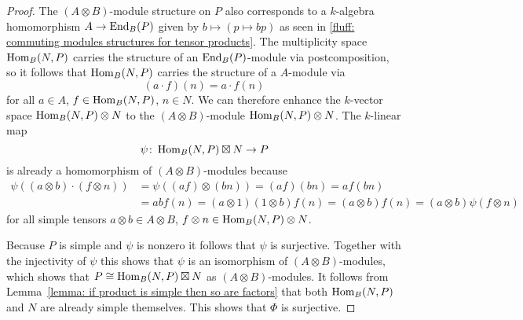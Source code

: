 \begin{proof}
  The $(A \otimes B)$-module structure on $P$ also corresponds to a $k$-algebra homomorphism $A \to \operatorname{End}_B(P)$ given by $b \mapsto (p \mapsto bp)$ as seen in \ref{fluff: commuting modules structures for tensor products}. 
  The multiplicity space $\operatorname{Hom}_B(N,P)$ carries the structure of an $\operatorname{End}_B(P)$-module via postcomposition, so it follows that $\operatorname{Hom}_B(N,P)$ carries the structure of a $A$-module via
  \[
      (a \cdot f)(n)
    = a \cdot f(n)
  \]
  for all $a \in A$, $f \in \operatorname{Hom}_B(N,P)$, $n \in N$.
  We can therefore enhance the $k$-vector space $\operatorname{Hom}_B(N,P) \otimes N$ to the $(A \otimes B)$-module $\operatorname{Hom}_B(N,P) \otimes N$.
  The $k$-linear map
  \[
            \psi
    \colon  \operatorname{Hom}_B(N,P) \mathbin{\boxtimes} N
    \to     P
  \]
  is already a homomorphism of $(A \otimes B)$-modules because
  \begin{align*}
        \psi((a \otimes b) \cdot (f \otimes n))
    &=  \psi((af) \otimes (bn))
     =  (af)(bn)
     =  a f(bn) \\
    &=  a b f(n)
     =  (a \otimes 1)(1 \otimes b) f(n)
     =  (a \otimes b) f(n)
     =  (a \otimes b) \psi(f \otimes n)
  \end{align*}
  for all simple tensors $a \otimes b \in A \otimes B$, $f \otimes n \in \operatorname{Hom}_B(N,P) \otimes N$.
  
  Because $P$ is simple and $\psi$ is nonzero it follows that $\psi$ is surjective.
  Together with the injectivity of $\psi$ this shows that $\psi$ is an isomorphism of $(A \otimes B)$-modules, which shows that $P \cong \operatorname{Hom}_B(N,P) \mathbin{\boxtimes} N$ as $(A \otimes B)$-modules.
  It follows from Lemma~\ref{lemma: if product is simple then so are factors} that both $\operatorname{Hom}_B(N,P)$ and $N$ are already simple themselves.
  This shows that $\Phi$ is surjective.
\end{proof}




